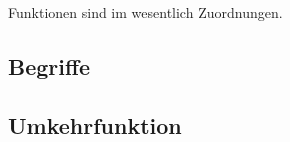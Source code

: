 Funktionen sind im wesentlich Zuordnungen.

\subsection{Begriffe}\label{subsec:funktionen_begriffe}


\subsection{Umkehrfunktion}\label{subsec:funktionen_umkehrfunktion}

